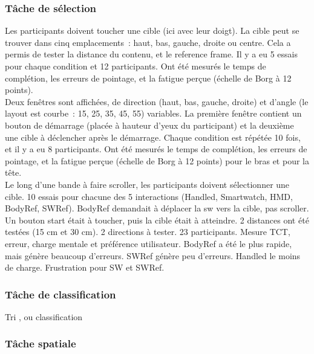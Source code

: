\subsubsection*{Tâche de sélection}
Les participants doivent toucher une cible (ici avec leur doigt). La cible peut se trouver dans cinq emplacements~: haut, bas, gauche, droite ou centre. Cela a permis de tester la distance du contenu, et le reference frame. Il y a eu 5 essais pour chaque condition et 12 participants. Ont été mesurés le temps de complétion, les erreurs de pointage, et la fatigue perçue (échelle de Borg à 12 points). \cite{EnsFinneganIrani2014} \\
Deux fenêtres sont affichées, de direction (haut, bas, gauche, droite) et d'angle (le layout est courbe~: 15\textdegree, 25\textdegree, 35\textdegree, 45\textdegree, 55\textdegree) variables. La première fenêtre contient un bouton de démarrage (placée à hauteur d'yeux du participant) et la deuxième une cible à déclencher après le démarrage. Chaque condition est répétée 10 fois, et il y a eu 8 participants. Ont été mesurés le temps de complétion, les erreurs de pointage, et la fatigue perçue (échelle de Borg à 12 points) pour le bras et pour la tête. \cite{EnsFinneganIrani2014} \\
Le long d'une bande à faire scroller, les participants doivent sélectionner une cible. 10 essais pour chacune des 5 interactions (Handled, Smartwatch, HMD, BodyRef, SWRef). BodyRef demandait à déplacer la sw vers la cible, pas scroller. Un bouton start était à toucher, puis la cible était à atteindre. 2 distances ont été testées (15 cm et 30 cm). 2 directions à tester. 23 participants. Mesure TCT, erreur, charge mentale et préférence utilisateur. BodyRef a été le plus rapide, mais génère beaucoup d'erreurs. SWRef génère peu d'erreurs. Handled le moins de charge. Frustration pour SW et SWRef. \cite{}

\subsubsection*{Tâche de classification}
Tri \cite{RobertsonCzerwinskiLarsonEtAl1998}, ou classification \cite{LiuChapuisBeaudouin-LafonEtAl2014} \\

\subsubsection*{Tâche spatiale}
\cite{BurigatChittaro2011}
\cite{BergeSerranoPerelmanEtAl2014}

